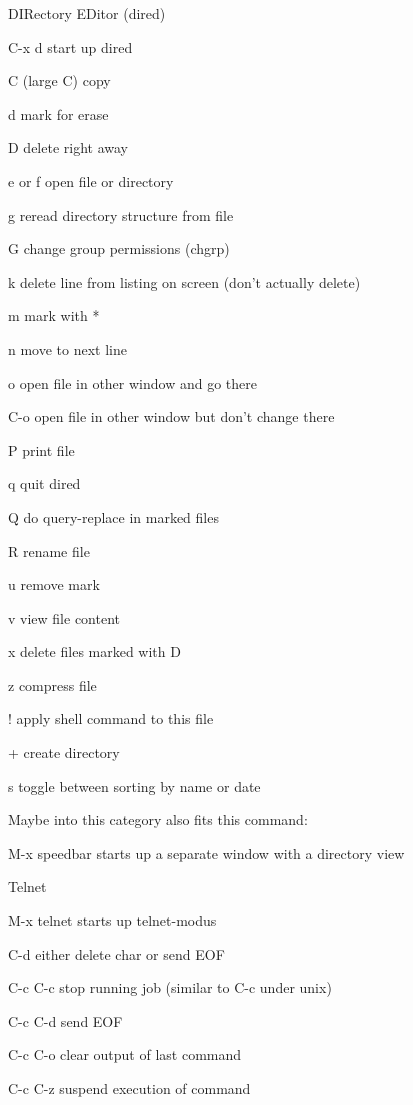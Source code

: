 \documentclass{article}
\begin{document}
DIRectory EDitor (dired)


C-x d start up dired


C (large C) copy 


d mark for erase


D delete right away


e or f open file or directory


g reread directory structure from file


G change group permissions (chgrp)


k delete line from listing on screen (don't actually delete)


m mark with *


n move to next line


o open file in other window and go there


C-o open file in other window but don't change there


P print file


q quit dired


Q do query-replace in marked files


R rename file


u remove mark


v view file content


x delete files marked with D


z compress file

! apply shell command to this file






+ create directory



s toggle between sorting by name or date



Maybe into this category also fits this command:


M-x speedbar starts up a separate window with a directory view



Telnet


M-x telnet starts up telnet-modus


C-d either delete char or send EOF


C-c C-c stop running job (similar to C-c under unix)


C-c C-d send EOF


C-c C-o clear output of last command


C-c C-z suspend execution of command
\end{document}
